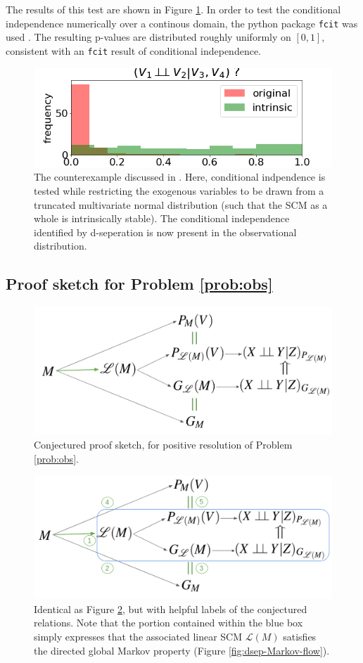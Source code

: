 \documentclass[letterpaper,10pt]{article}
\begin{document}
The results of this test are shown in Figure \ref{fig:counterexample_domain_restriction}. In order to test the conditional independence numerically over a continous domain, the python package \verb|fcit| was used \cite{fcit}. The resulting p-values are distributed roughly uniformly on $[0,1]$, consistent with an \verb|fcit| result of conditional independence.

\begin{figure}
\centering
\includegraphics[width=.5\linewidth]{pics/my_own/counterexample_domain_restriction.png}
\caption{The counterexample discussed in \cite{Acyclification,Foundations}. Here, conditional indpendence is tested while restricting the exogenous variables to be drawn from a truncated multivariate normal distribution (such that the SCM as a whole is intrinsically stable). The conditional independence identified by d-seperation is now present in the observational distribution.}
\label{fig:counterexample_domain_restriction}
\end{figure}
 
\subsection{Proof sketch for Problem \ref{prob:obs}}

\begin{figure}
\centering
\includegraphics[width=.5\linewidth]{pics/my_own/research_plan_flow.png}
\caption{Conjectured proof sketch, for positive resolution of Problem \ref{prob:obs}.}
\label{fig:research-plan-flow}
\end{figure}

\begin{figure}
\centering
\includegraphics[width=.5\linewidth]{pics/my_own/research_plan_numbered_boxed.png}
\caption{Identical as Figure \ref{fig:research-plan-flow}, but with helpful labels of the conjectured relations. Note that the portion contained within the blue box simply expresses that the associated linear SCM $\mathcal{L}(M)$ satisfies the directed global Markov property (Figure \ref{fig:dsep-Markov-flow}).}
\label{fig:research_plan_numbered_boxed}
\end{figure}
\end{document}
